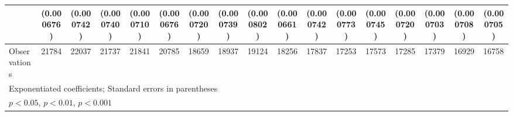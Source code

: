 {\begin{tabular}{l*{16}{c}}
                    &  (0.000676)         &  (0.000742)         &  (0.000740)         &  (0.000710)         &  (0.000676)         &  (0.000720)         &  (0.000739)         &  (0.000802)         &  (0.000661)         &  (0.000742)         &  (0.000773)         &  (0.000745)         &  (0.000720)         &  (0.000703)         &  (0.000708)         &  (0.000705)         \\
\hline
Observations        &       21784         &       22037         &       21737         &       21841         &       20785         &       18659         &       18937         &       19124         &       18256         &       17837         &       17253         &       17573         &       17285         &       17379         &       16929         &       16758         \\
\hline\hline
\multicolumn{17}{l}{\footnotesize Exponentiated coefficients; Standard errors in parentheses}\\
\multicolumn{17}{l}{\footnotesize \sym{*} \(p<0.05\), \sym{**} \(p<0.01\), \sym{***} \(p<0.001\)}\\
\end{tabular}
}
